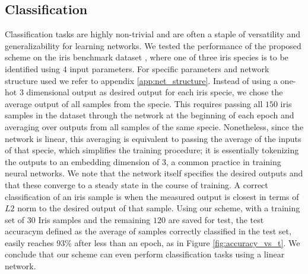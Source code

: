 \documentclass[%
 reprint,
 amsmath,amssymb,
 aps,
]{revtex4-2}
\begin{document}
\subsection{Classification}\label{sec:Classification}

    Classification tasks are highly non-trivial and are often a staple of versatility and generalizability for learning networks. We tested the performance of the proposed scheme on the iris benchmark dataset \cite{fisher1936use}, where one of three iris species is to be identified using $4$ input parameters. For specific parameters and network structure used we refer to appendix \ref{app:net_structure}. 
    Instead of using a one-hot $3$ dimensional output as desired output for each iris specie, we chose the average output of all samples from the specie. This requires passing all $150$ iris samples in the dataset through the network at the beginning of each epoch and averaging over outputs from all samples of the same specie. Nonetheless, since the network is linear, this averaging is equivalent to passing the average of the inputs of that specie, which simplifies the training procedure; it is essentially tokenizing the outputs to an embedding dimension of $3$, a common practice in training neural networks. We note that the network itself specifies the desired outputs and that these converge to a steady state in the course of training. A correct classification of an iris sample is when the measured output is closest in terms of $L2$ norm to the desired output of that sample. Using our scheme, with a training set of $30$ Iris samples and the remaining $120$ are saved for test, the test accuracym defined as the average of samples correctly classified in the test set, easily reaches $93\%$ after less than an epoch, as in Figure \ref{fig:accuracy_vs_t}. We conclude that our scheme can even perform classification tasks using a linear network.
\end{document}
